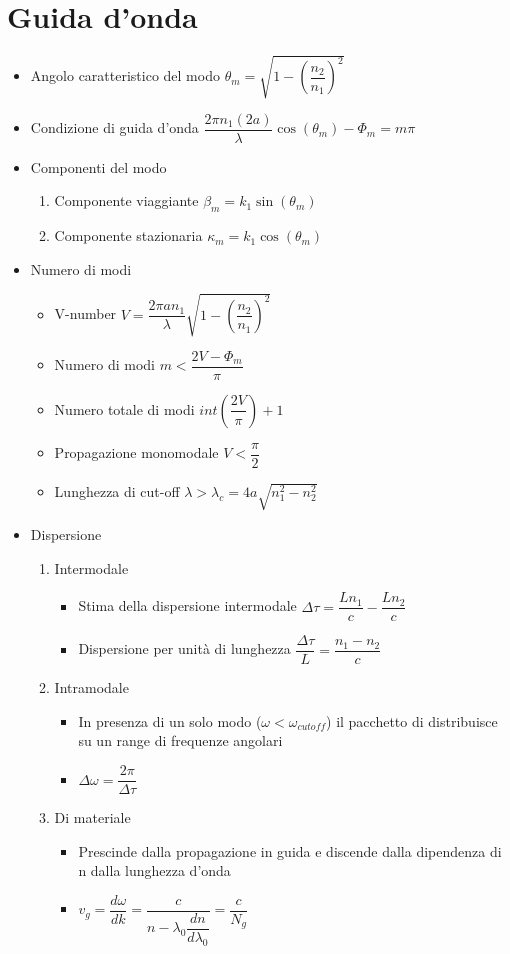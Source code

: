 \documentclass{article}
\begin{document}
\section{Guida d'onda}
\begin{itemize}
	\item Angolo caratteristico del modo \( \theta_m = \sqrt{1 - \left(\dfrac{n_2}{n_1} \right) ^ 2} \)
	\item Condizione di guida d'onda \( \dfrac{2 \pi n_1 (2 a)}{\lambda} \cos(\theta_m) - \Phi_m = m \pi \)
	\item Componenti del modo
	\begin{enumerate}
		\item Componente viaggiante \( \beta_m = k_1 \sin(\theta_m)\)
		\item Componente stazionaria \( \kappa_m = k_1 \cos(\theta_m) \)
	\end{enumerate}
	\item Numero di modi
	\begin{itemize}
		\item V-number \(\displaystyle V = \dfrac{2 \pi a n_1}{\lambda} \sqrt{1 - \left(\dfrac{n_2}{n_1}\right) ^ 2} \)
		\item Numero di modi \( m < \dfrac{2V - \Phi_m}{\pi} \)
		\item Numero totale di modi \( int\left(\dfrac{2V}{\pi} \right) + 1 \)
		\item Propagazione monomodale \( V < \dfrac{\pi}{2} \)
		\item Lunghezza di cut-off \( \lambda > \lambda_c = 4a \sqrt{n_1^2 - n_2^2} \)
	\end{itemize}
	\item Dispersione
	\begin{enumerate}
		\item Intermodale
		\begin{itemize}
			\item Stima della dispersione intermodale \( \Delta \tau = \dfrac{L n_1}{c} - \dfrac{L n_2}{c} \)
			\item Dispersione per unità di lunghezza \(  \dfrac{\Delta \tau}{L} = \dfrac{n_1 - n_2}{c} \)
		\end{itemize}
		\item Intramodale
		\begin{itemize}
			\item In presenza di un solo modo (\( \omega < \omega_{cutoff} \)) il pacchetto di distribuisce su un range di frequenze angolari
			\item \( \Delta \omega = \dfrac{2 \pi}{\Delta \tau} \)
		\end{itemize}
		\item Di materiale
		\begin{itemize}
			\item Prescinde dalla propagazione in guida e discende dalla dipendenza di n dalla lunghezza d'onda
			\item \(  v_g = \dfrac{d \omega}{d k} = \dfrac{c}{n - \lambda_0 \dfrac{dn}{d \lambda_0}} = \dfrac{c}{N_g} \)
		\end{itemize}
	\end{enumerate}
\end{itemize}
\end{document}
